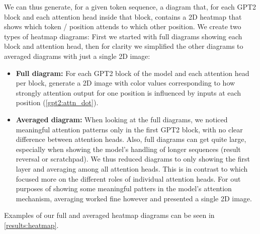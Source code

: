 We can thus generate, for a given token sequence, a diagram that, for each GPT2 block and each attention head inside that block, contains a 2D heatmap that shows which token / position attends to which other position.
We create two types of heatmap diagrams: First we started with full diagrams showing each block and attention head, then for clarity we simplified the other diagrams to averaged diagrams with just a single 2D image:

\begin{itemize}
	\item \textbf{Full diagram:} For each GPT2 block of the model and each attention head per block, generate a 2D image with color values corresponding to how strongly attention output for one position is influenced by inputs at each position (\cref{gpt2:attn_dot}).
	\item \textbf{Averaged diagram:} When looking at the full diagrams, we noticed meaningful attention patterns only in the first GPT2 block, with no clear difference between attention heads. Also, full diagrams can get quite large, especially when showing the model's handling of longer sequences (result reversal or scratchpad). We thus reduced diagrams to only showing the first layer and averaging among all attention heads. This is in contrast to \cite{bertsecrets} which focused more on the different roles of individual attention heads. For out purposes of showing some meaningful patters in the model's attention mechanism, averaging worked fine however and presented a single 2D image.
\end{itemize}

Examples of our full and averaged heatmap diagrams can be seen in \cref{results:heatmap}.
